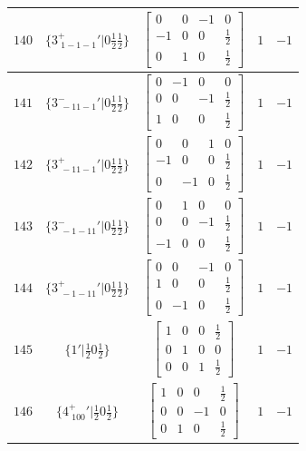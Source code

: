 \documentclass[fleqn,8pt]{jsarticle}
\begin{document}
\begin{longtable}{ccccc}
$ 140 $ & $ \{3^{+}_{\,\,1-1-1}{}'|0 \frac{1}{2} \frac{1}{2}\} $ & $ \begin{bmatrix} 0 & 0 & -1 & 0 \\ -1 & 0 & 0 & \frac{1}{2} \\ 0 & 1 & 0 & \frac{1}{2} \end{bmatrix} $ & $ 1 $ & $ -1 $ \\ \hline
$ 141 $ & $ \{3^{-}_{\,\,-11-1}{}'|0 \frac{1}{2} \frac{1}{2}\} $ & $ \begin{bmatrix} 0 & -1 & 0 & 0 \\ 0 & 0 & -1 & \frac{1}{2} \\ 1 & 0 & 0 & \frac{1}{2} \end{bmatrix} $ & $ 1 $ & $ -1 $ \\ \hline
$ 142 $ & $ \{3^{+}_{\,\,-11-1}{}'|0 \frac{1}{2} \frac{1}{2}\} $ & $ \begin{bmatrix} 0 & 0 & 1 & 0 \\ -1 & 0 & 0 & \frac{1}{2} \\ 0 & -1 & 0 & \frac{1}{2} \end{bmatrix} $ & $ 1 $ & $ -1 $ \\ \hline
$ 143 $ & $ \{3^{-}_{\,\,-1-11}{}'|0 \frac{1}{2} \frac{1}{2}\} $ & $ \begin{bmatrix} 0 & 1 & 0 & 0 \\ 0 & 0 & -1 & \frac{1}{2} \\ -1 & 0 & 0 & \frac{1}{2} \end{bmatrix} $ & $ 1 $ & $ -1 $ \\ \hline
$ 144 $ & $ \{3^{+}_{\,\,-1-11}{}'|0 \frac{1}{2} \frac{1}{2}\} $ & $ \begin{bmatrix} 0 & 0 & -1 & 0 \\ 1 & 0 & 0 & \frac{1}{2} \\ 0 & -1 & 0 & \frac{1}{2} \end{bmatrix} $ & $ 1 $ & $ -1 $ \\ \hline
$ 145 $ & $ \{1{}'|\frac{1}{2} 0 \frac{1}{2}\} $ & $ \begin{bmatrix} 1 & 0 & 0 & \frac{1}{2} \\ 0 & 1 & 0 & 0 \\ 0 & 0 & 1 & \frac{1}{2} \end{bmatrix} $ & $ 1 $ & $ -1 $ \\ \hline
$ 146 $ & $ \{4^{+}_{\,\,100}{}'|\frac{1}{2} 0 \frac{1}{2}\} $ & $ \begin{bmatrix} 1 & 0 & 0 & \frac{1}{2} \\ 0 & 0 & -1 & 0 \\ 0 & 1 & 0 & \frac{1}{2} \end{bmatrix} $ & $ 1 $ & $ -1 $ \\ \hline

\end{longtable}
\end{document}

